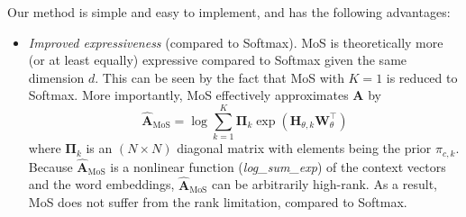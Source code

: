 Our method is simple and easy to implement, and has the following advantages:
\begin{itemize}[leftmargin=1.5em,label=$\bullet$]
\item \textit{Improved expressiveness} (compared to Softmax). MoS is theoretically more (or at least equally) expressive compared to Softmax given the same dimension $d$. This can be seen by the fact that MoS with $K=1$ is reduced to Softmax. More importantly, MoS effectively approximates $\mathbf{A}$ by
\[
\hat{\mathbf{A}}_\text{MoS} = \log \sum_{k = 1}^K \mathbf{\Pi}_k \exp (\mathbf{H}_{\theta,k} \mathbf{W}_\theta^\top)
\]
where $\mathbf{\Pi}_k$ is an $(N \times N)$ diagonal matrix with elements being the prior $\pi_{c,k}$. Because $\hat{\mathbf{A}}_\text{MoS}$ is a nonlinear function ({\em log\_sum\_exp}) of the context vectors and the word embeddings, $\hat{\mathbf{A}}_\text{MoS}$ can be arbitrarily high-rank. As a result, MoS does not suffer from the rank limitation, compared to Softmax.


\end{itemize}
